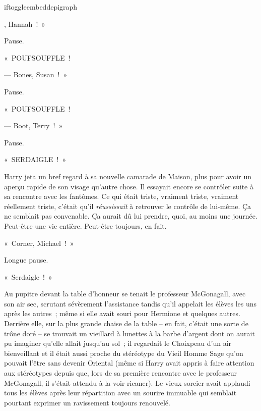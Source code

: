 
iftoggle{embeddepigraph}{}{}

, Hannah~!~»

\hplettrineextrapara
Pause.

«~POUFSOUFFLE~!

--- Bones, Susan~!~»

Pause.

«~POUFSOUFFLE~!

--- Boot, Terry~!~»

Pause.

«~SERDAIGLE~!~»

Harry jeta un bref regard à sa nouvelle camarade de Maison, plus pour avoir un aperçu rapide de son visage qu'autre chose. Il essayait encore se contrôler suite à sa rencontre avec les fantômes. Ce qui était triste, vraiment triste, vraiment réellement triste, c'était qu'il \emph{réussissait} à retrouver le contrôle de lui-même. Ça ne semblait pas convenable. Ça aurait dû lui prendre, quoi, au moins une journée. Peut-être une vie entière. Peut-être toujours, en fait.

«~Corner, Michael~!~»

Longue pause.

«~Serdaigle~!~»

Au pupitre devant la table d'honneur se tenait le professeur McGonagall, avec son air sec, scrutant sévèrement l'assistance tandis qu'il appelait les élèves les uns après les autres~; même si elle avait souri pour Hermione et quelques autres. Derrière elle, sur la plus grande chaise de la table -- en fait, c'était une sorte de trône doré -- se trouvait un vieillard à lunettes à la barbe d'argent dont on aurait pu imaginer qu'elle allait jusqu'au sol~; il regardait le Choixpeau d'un air bienveillant et il était aussi proche du stéréotype du Vieil Homme Sage qu'on pouvait l'être sans devenir Oriental (même si Harry avait appris à faire attention aux stéréotypes depuis que, lors de sa première rencontre avec le professeur McGonagall, il s'était attendu à la voir ricaner). Le vieux sorcier avait applaudi tous les élèves après leur répartition avec un sourire immuable qui semblait pourtant exprimer un ravissement toujours renouvelé.

